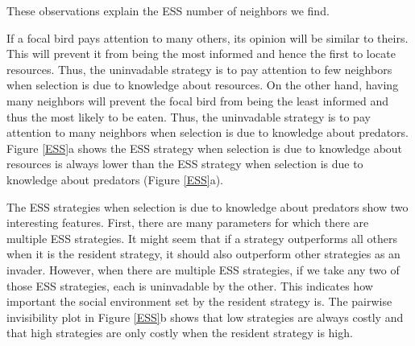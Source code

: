 \documentclass{article}
\begin{document}
These observations explain the ESS number of neighbors we find.

If a focal bird pays attention to many others, its opinion will be similar to theirs. This will prevent it from being the most informed and hence the first to locate resources. Thus, the uninvadable strategy is to pay attention to few neighbors when selection is due to knowledge about resources. On the other hand, having many neighbors will prevent the focal bird from being the least informed and thus the most likely to be eaten.  Thus, the uninvadable strategy is to pay attention to many neighbors when selection is due to knowledge about predators. Figure \ref{ESS}a shows the ESS strategy when selection is due to knowledge about resources is always lower than the ESS strategy when selection is due to knowledge about predators (Figure \ref{ESS}a).

The ESS strategies when selection is due to knowledge about predators show two interesting features. First, there are many parameters for which there are multiple ESS strategies. It might seem that if a strategy outperforms all others when it is the resident strategy, it should also outperform other strategies as an invader. However, when there are multiple ESS strategies, if we take any two of those ESS strategies, each is uninvadable by the other. This indicates how important the social environment set by the resident strategy is. The pairwise invisibility plot in Figure \ref{ESS}b shows that low strategies are always costly and that high strategies are only costly when the resident strategy is high. 
\end{document}
